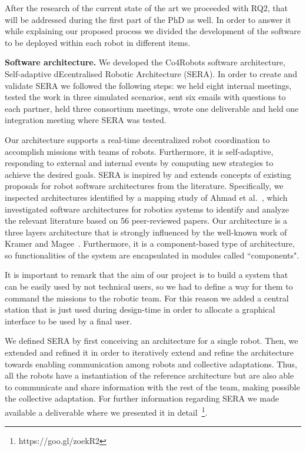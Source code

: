 After the research of the current state of the art we proceeded with RQ2, that will be addressed during the first part of the PhD as well.
In order to answer it while explaining our proposed process we divided the development of the software to be deployed within each robot in different items.

\textbf{Software architecture.}
We developed the Co4Robots software architecture, Self-adaptive dEcentralised Robotic Architecture (SERA).
In order to create and validate SERA we followed the following steps: %
we held eight internal meetings, tested the work in three simulated scenarios, sent six emails with questions to each partner, held three consortium meetings, wrote one deliverable and held one integration meeting where SERA was tested.

Our architecture supports a real-time decentralized robot coordination to accomplish missions with teams of robots. 
Furthermore, it is self-adaptive, responding to external and internal events by computing new strategies to achieve the desired goals.
SERA is inspired by and extends concepts of existing proposals for robot software architectures from the literature. 
Specifically, we inspected architectures identified by a mapping study of Ahmad et al.~\cite{Ahmad201616}, which investigated software architectures for robotics systems to identify and analyze the relevant literature based on 56 peer-reviewed papers.
Our architecture is a three layers architecture that is strongly influenced by the well-known work of Kramer and Magee~\cite{kramer}.
Furthermore, it is a component-based type of architecture, so functionalities of the system are encapsulated in modules called ``components".

It is important to remark that the aim of our project is to build a system that can be easily used by not technical users, so we had to define a way for them to command the missions to the robotic team.
For this reason we added a central station that is just used during design-time in order to allocate a graphical interface to be used by a final user.

We defined SERA by first conceiving an architecture for a single robot. 
Then, we extended and refined it in order to iteratively extend and refine the architecture towards enabling communication among robots and collective adaptations. 
Thus, all the robots have a instantiation of the reference architecture but are also able to communicate and share information with the rest of the team, making possible the collective adaptation. 
For further information regarding SERA we made available a deliverable where we presented it in detail~\footnote{https://goo.gl/zoekR2}.

